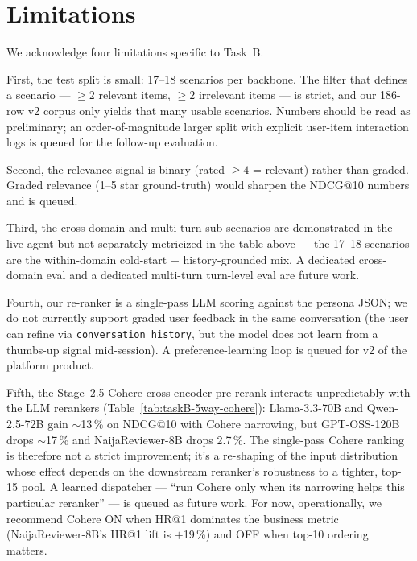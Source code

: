 \documentclass[sigconf,nonacm,balance]{acmart}
\begin{document}
\section{Limitations}
\label{sec:limitations}

We acknowledge four limitations specific to Task~B.

First, the test split is small: 17--18 scenarios per backbone. The
filter that defines a scenario --- $\geq 2$ relevant items, $\geq 2$
irrelevant items --- is strict, and our 186-row v2 corpus only yields
that many usable scenarios. Numbers should be read as preliminary;
an order-of-magnitude larger split with explicit user-item interaction
logs is queued for the follow-up evaluation.

Second, the relevance signal is binary (rated $\geq 4$ = relevant)
rather than graded. Graded relevance (1--5 star ground-truth) would
sharpen the NDCG@10 numbers and is queued.

Third, the cross-domain and multi-turn sub-scenarios are demonstrated
in the live agent but not separately metricized in the table above ---
the 17--18 scenarios are the within-domain cold-start + history-grounded
mix. A dedicated cross-domain eval and a dedicated multi-turn
turn-level eval are future work.

Fourth, our re-ranker is a single-pass LLM scoring against the
persona JSON; we do not currently support graded user feedback in the
same conversation (the user can refine via \texttt{conversation\_history},
but the model does not learn from a thumbs-up signal mid-session). A
preference-learning loop is queued for v2 of the platform product.

Fifth, the Stage~2.5 Cohere cross-encoder pre-rerank interacts
unpredictably with the LLM rerankers
(Table~\ref{tab:taskB-5way-cohere}): Llama-3.3-70B and Qwen-2.5-72B
gain $\sim$13\,\% on NDCG@10 with Cohere narrowing, but
GPT-OSS-120B drops $\sim$17\,\% and NaijaReviewer-8B drops 2.7\,\%.
The single-pass Cohere ranking is therefore not a strict improvement;
it's a re-shaping of the input distribution whose effect depends on
the downstream reranker's robustness to a tighter, top-15 pool.
A learned dispatcher --- ``run Cohere only when its narrowing helps
this particular reranker'' --- is queued as future work. For now,
operationally, we recommend Cohere ON when HR@1 dominates the
business metric (NaijaReviewer-8B's HR@1 lift is $+$19\,\%) and OFF
when top-10 ordering matters.
\end{document}

